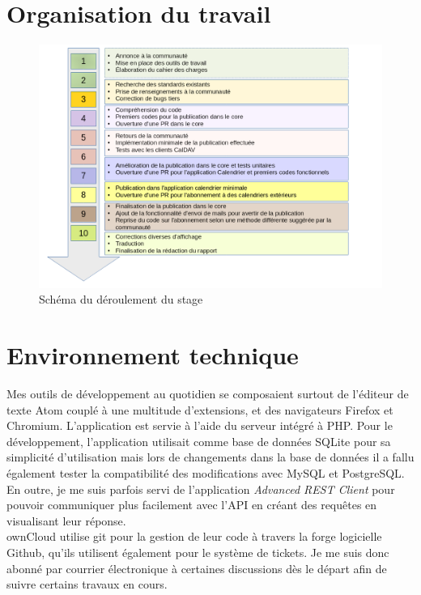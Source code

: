 \documentclass[10pt,a4paper, twoside]{report}
\begin{document}
	\section{Organisation du travail}
	\begin{figure}[H]
		\centering
		\caption{Schéma du déroulement du stage}
		\centerline{\includegraphics[width=1.45\textwidth]{images/deroulement.png}}
		\label{normal_case}
	\end{figure}
	
	\section{Environnement technique}
	Mes outils de développement au quotidien se composaient surtout de l'éditeur de texte Atom couplé à une multitude d'extensions, et des navigateurs Firefox et Chromium. L'application est servie à l'aide du serveur intégré à PHP. Pour le développement, l'application utilisait comme base de données SQLite pour sa simplicité d'utilisation mais lors de changements dans la base de données il a fallu également tester la compatibilité des modifications avec MySQL et PostgreSQL.
	En outre, je me suis parfois servi de l'application \textit{Advanced REST Client} pour pouvoir communiquer plus facilement avec l'API en créant des requêtes en visualisant leur réponse.
	\\
	
	ownCloud utilise git pour la gestion de leur code à travers la forge logicielle Github, qu'ils utilisent également pour le système de tickets. Je me suis donc abonné par courrier électronique à certaines discussions dès le départ afin de suivre certains travaux en cours.
	\\
	
\end{document}
